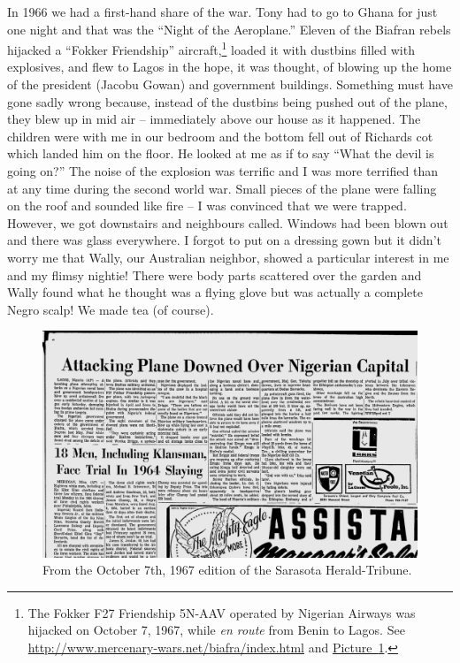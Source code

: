 In 1966 we had a first-hand share of the war. Tony had to go to Ghana
for just one night and that was the ``Night of the Aeroplane.'' Eleven
of the Biafran rebels hijacked a ``Fokker Friendship''
aircraft,\footnote{The Fokker F27 Friendship 5N-AAV operated by
  Nigerian Airways was hijacked on October 7, 1967, while \textit{en
    route} from Benin to Lagos. See
  \href{http://www.mercenary-wars.net/biafra/index.html}{http://www.mercenary-wars.net/biafra/index.html}
  and
  \href{http://news.google.com/newspapers?nid=1774&dat=19671007&id=Pn4fAAAAIBAJ&sjid=6mUEAAAAIBAJ&pg=7328,1581485}{Picture~\ref{hijacking}}.
} loaded it with dustbins filled with explosives, and flew to Lagos in
the hope, it was thought, of blowing up the home of the president
(Jacobu Gowan) and government buildings. Something must have gone
sadly wrong because, instead of the dustbins being pushed out of the
plane, they blew up in mid air -- immediately above our house as it
happened. The children were with me in our bedroom and the bottom fell
out of Richards cot which landed him on the floor. He looked at me as
if to say ``What the devil is going on?'' The noise of the explosion
was terrific and I was more terrified than at any time during the
second world war. Small pieces of the plane were falling on the roof
and sounded like fire -- I was convinced that we were
trapped. However, we got downstairs and neighbours called. Windows had
been blown out and there was glass everywhere. I forgot to put on a
dressing gown but it didn’t worry me that Wally, our Australian
neighbor, showed a particular interest in me and my flimsy nightie!
There were body parts scattered over the garden and Wally found what
he thought was a flying glove but was actually a complete Negro scalp!
We made tea (of course).

\begin{figure}
  \centering
  \includegraphics[width=\textwidth]{photos/nigeria1.jpg}
  \caption{From the October 7th, 1967 edition of the Sarasota
    Herald-Tribune.}
  \label{hijacking}
\end{figure}

